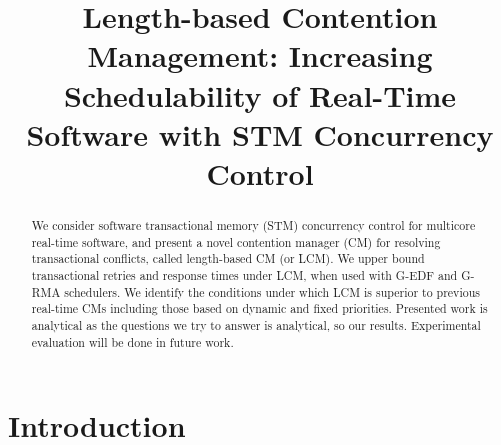 \documentclass[conference]{IEEEtran}
\begin{document}
\title{Length-based Contention Management: Increasing Schedulability of Real-Time Software with STM Concurrency Control}

\maketitle

\begin{abstract}
We consider software transactional memory (STM) concurrency control for multicore real-time software, and present a novel contention manager (CM) for resolving transactional conflicts, called length-based CM (or LCM). We upper bound transactional retries and response times under LCM, when used with G-EDF and  G-RMA schedulers. We identify the conditions under which LCM is superior to previous real-time CMs including those based on dynamic and fixed priorities. %
Presented work is analytical as the questions we try to answer is analytical, so our results. Experimental evaluation will be done in future work.
\end{abstract}


\section{Introduction}
\label{sec:intro}
\end{document}

